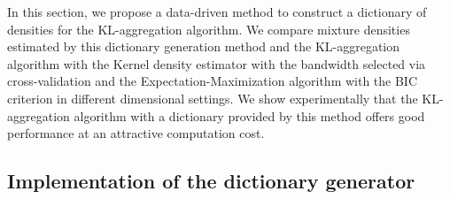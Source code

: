 In this section, we propose a data-driven method to construct a dictionary of densities for the KL-aggregation algorithm. We compare mixture densities estimated by this dictionary generation method and the KL-aggregation algorithm with the Kernel density estimator with the bandwidth selected via cross-validation and the Expectation-Maximization algorithm with the BIC criterion in different dimensional settings. We show experimentally that the KL-aggregation algorithm with a dictionary provided by this method offers good performance at an attractive computation cost.

\subsection{Implementation of the dictionary generator}

